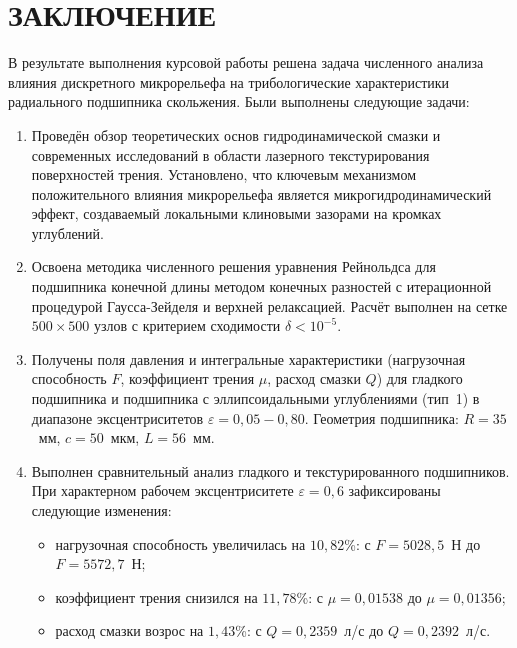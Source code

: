\section*{ЗАКЛЮЧЕНИЕ}
{}

В результате выполнения курсовой работы решена задача численного анализа влияния дискретного микрорельефа на трибологические характеристики радиального подшипника скольжения. Были выполнены следующие задачи:

\begin{enumerate}
    \item Проведён обзор теоретических основ гидродинамической смазки и современных исследований в области лазерного текстурирования поверхностей трения. Установлено, что ключевым механизмом положительного влияния микрорельефа является микрогидродинамический эффект, создаваемый локальными клиновыми зазорами на кромках углублений.

    \item Освоена методика численного решения уравнения Рейнольдса для подшипника конечной длины методом конечных разностей с итерационной процедурой Гаусса-Зейделя и верхней релаксацией. Расчёт выполнен на сетке $500 \times 500$ узлов с критерием сходимости $\delta < 10^{-5}$.

    \item Получены поля давления и интегральные характеристики (нагрузочная способность $F$, коэффициент трения $\mu$, расход смазки $Q$) для гладкого подшипника и подшипника с эллипсоидальными углублениями (тип~1) в диапазоне эксцентриситетов $\varepsilon = 0{,}05 - 0{,}80$. Геометрия подшипника: $R = 35$~мм, $c = 50$~мкм, $L = 56$~мм.

    \item Выполнен сравнительный анализ гладкого и текстурированного подшипников. При характерном рабочем эксцентриситете $\varepsilon = 0{,}6$ зафиксированы следующие изменения:
    \begin{itemize}
        \item нагрузочная способность увеличилась на $10{,}82$\%: с $F = 5028{,}5$~Н до $F = 5572{,}7$~Н;
        \item коэффициент трения снизился на $11{,}78$\%: с $\mu = 0{,}01538$ до $\mu = 0{,}01356$;
        \item расход смазки возрос на $1{,}43$\%: с $Q = 0{,}2359$~л/с до $Q = 0{,}2392$~л/с.
    \end{itemize}
\end{enumerate}

